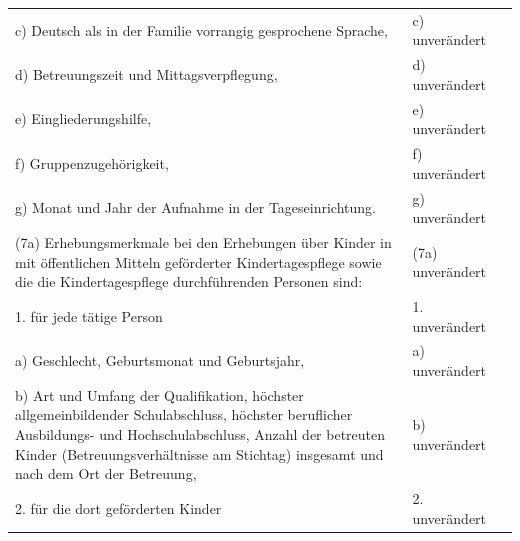 \documentclass[10pt,a4paper,landscape]{article}
\begin{document}
\begin{longtable}{|L{8.2cm}|L{8.2cm}|L{8.2cm}|}
\hhline{|---|}
c)   \newline Deutsch als in der Familie vorrangig  \newline gesprochene Sprache, & c) unverändert &  \\
\hhline{|---|}
d)   \newline Betreuungszeit und Mittagsverpflegung, & d) unverändert &  \\
\hhline{|---|}
e)   \newline Eingliederungshilfe, & e) unverändert &  \\
\hhline{|---|}
f)   \newline Gruppenzugehörigkeit, & f) unverändert &  \\
\hhline{|---|}
g)   \newline Monat und Jahr der Aufnahme in der  \newline Tageseinrichtung. & g) unverändert &  \\
\hhline{|---|}
(7a)   \newline Erhebungsmerkmale bei den Erhebungen  \newline über Kinder in mit öffentlichen Mitteln  \newline geförderter Kindertagespflege sowie die die  \newline Kindertagespflege durchführenden  \newline Personen sind: & (7a) unverändert &  \\
\hhline{|---|}
1.   \newline für jede tätige Person & 1. unverändert &  \\
\hhline{|---|}
a)   \newline Geschlecht, Geburtsmonat und  \newline Geburtsjahr, & a) unverändert &  \\
\hhline{|---|}
b)   \newline Art und Umfang der Qualifikation, höchster  \newline allgemeinbildender Schulabschluss,  \newline höchster beruflicher Ausbildungs- und  \newline Hochschulabschluss, Anzahl der betreuten  \newline Kinder (Betreuungsverhältnisse am  \newline Stichtag) insgesamt und nach dem Ort der  \newline Betreuung, & b) unverändert &  \\
\hhline{|---|}
2.   \newline für die dort geförderten Kinder & 2. unverändert &  \\

\end{longtable}
\end{document}
